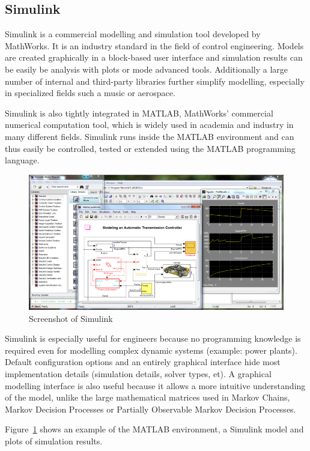 \subsection{Simulink}

Simulink is a commercial modelling and simulation tool developed by MathWorks. It is an industry standard in the field of control engineering. Models are created graphically in a block-based user interface and simulation results can be easily be analysis with plots or mode advanced tools. Additionally a large number of internal and third-party libraries further simplify modelling, especially in specialized fields such a music or aerospace.

Simulink is also tightly integrated in MATLAB, MathWorks' commercial numerical computation tool, which is widely used in academia and industry in many different fields. Simulink runs inside the MATLAB environment and can thus easily be controlled, tested or extended using the MATLAB programming language.

\begin{figure}[simulink_screenshot]
\includegraphics[width=16cm]{media/simulink_screenshot.png}
\caption{Screenshot of Simulink}
\label{simulink_screenshot}
\end{figure}

Simulink is especially useful for engineers because no programming knowledge is required even for modelling complex dynamic systems (example: power plants). Default configuration options and an entirely graphical interface hide most implementation details (simulation details, solver types, et). A graphical modelling interface is also useful because it allows a more intuitive understanding of the model, unlike the large mathematical matrices used in Markov Chains, Markov Decision Processes or Partially Observable Markov Decision Processes.

Figure~\ref{simulink_screenshot} shows an example of the MATLAB environment, a Simulink model and plots of simulation results.
